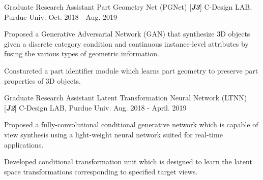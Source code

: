 \begin{cventries}

\cventry
{Graduate Research Assistant} %
{Part Geometry Net (PGNet) [\textit{\textbf{J3}}]} %
{C-Design LAB, Purdue Univ.} %
{Oct. 2018 - Aug. 2019} %
{ %
\begin{cvitems}
\item {Proposed a Generative Adversarial Network (GAN) that synthesize 3D objects given a discrete category condition and continuous instance-level attributes by fusing the various types of geometric information.}
\item {Consturcted a part identifier module which learns part geometry to preserve part properties of 3D objects.}
\end{cvitems}
}


\cventry
{Graduate Research Assistant} %
{Latent Transformation Neural Network (LTNN) [\textit{\textbf{J2}}]} %
{C-Design LAB, Purdue Univ.} %
{Aug. 2018 - April. 2019} %
{ %
\begin{cvitems}
\item {Proposed a fully-convolutional conditional generative network which is capable of view synthesis using a light-weight neural network suited for real-time applications.}
\item {Developed conditional transformation unit which is designed to learn the latent space transformations corresponding to specified target views.}
\end{cvitems}
}




\end{cventries}
